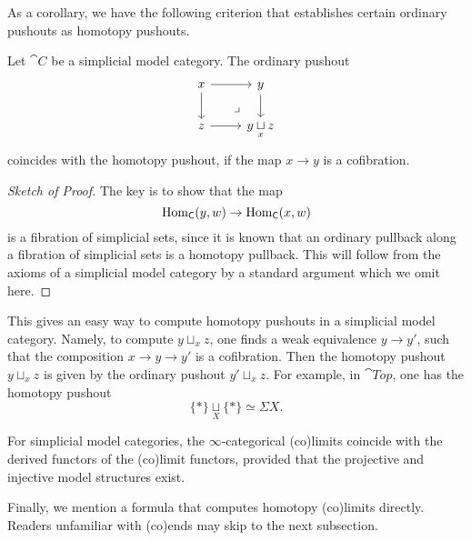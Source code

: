 As a corollary, we have the following criterion
that establishes certain ordinary pushouts as homotopy pushouts.

\begin{proposition}
    Let $\cat C$ be a simplicial model category.
    The ordinary pushout 
    \[ \begin{tikzcd}
        x\ar[r]\ar[d]\ar[dr,phantom,pos=.7,"\lrcorner"] & y\ar[d] \\
        z\ar[r] & y\underset{x}{\sqcup}z
    \end{tikzcd} \]
    coincides with the homotopy pushout,
    if the map $x\to y$ is a cofibration.
\end{proposition}

\begin{proof}[Sketch of Proof]
    The key is to show that the map 
    \[ \operatorname{Hom}_{\mathsf{C}}(y,w) \to \operatorname{Hom}_{\mathsf{C}}(x,w) \]
    is a fibration of simplicial sets,
    since it is known that an ordinary pullback along a fibration of simplicial sets 
    is a homotopy pullback.
    This will follow from the axioms of a simplicial model category 
    by a standard argument which we omit here.
\end{proof}

This gives an easy way to compute homotopy pushouts
in a simplicial model category. Namely,
to compute $y\sqcup_xz$, one finds a weak equivalence $y\to y'$,
such that the composition $x\to y\to y'$ is a cofibration.
Then the homotopy pushout $y\sqcup_xz$
is given by the ordinary pushout $y'\sqcup_xz$. For example,
in $\cat{Top}$, one has the homotopy pushout
\[ \{*\}\underset{X}{\sqcup}\{*\}\simeq\Sigma X. \]

\begin{remark}
    For simplicial model categories, 
    the $\infty$-categorical (co)limits coincide with 
    the derived functors of the (co)limit functors,
    provided that the projective and injective model structures exist.
    \varqed
\end{remark}

Finally, we mention a formula that computes homotopy (co)limits directly.
Readers unfamiliar with (co)ends may skip to the next subsection.

